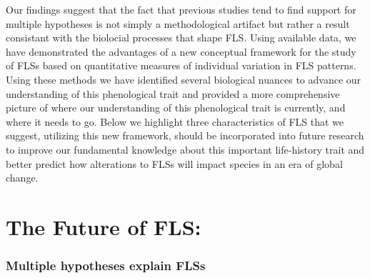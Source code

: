 \documentclass{article}
\begin{document}
Our findings suggest that the fact that previous studies tend to find support for multiple hypotheses is not simply a methodological artifact but rather a result consistant with the biolocial processes that shape FLS. Using available data, we have demonstrated the advantages of a new conceptual framework for the study of FLSs based on quantitative measures of individual variation in FLS patterns. Using these methods we have identified several biological nuances to advance our understanding of this phenological trait and provided a more comprehensive picture of where our understanding of this phenological trait is currently, and where it needs to go. Below we highlight three characteristics of FLS that we suggest, utilizing this new framework, should be incorporated into future research to improve our fundamental knowledge about this important life-history trait and better predict how alterations to FLSs will impact species in an era of global change.
\section*{The Future of FLS:}
\subsubsection*{Multiple hypotheses explain FLSs}
\end{document}
